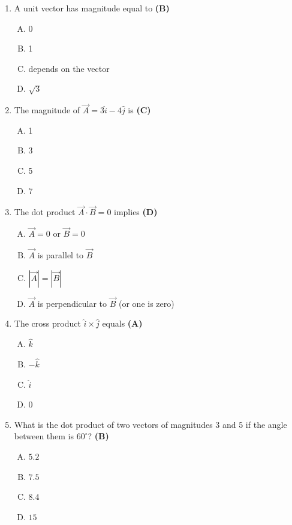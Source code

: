 \documentclass[10pt,a4paper]{article}
\begin{document}
\begin{enumerate}[1.]

\item A unit vector has magnitude equal to \hfill \textbf{(B)}
\begin{enumerate}[(A)]
    \item 0
    \item 1
    \item depends on the vector
    \item $\sqrt{3}$
\end{enumerate}

\item The magnitude of $\vec{A} = 3\hat{i} - 4\hat{j}$ is \hfill \textbf{(C)}
\begin{enumerate}[(A)]
    \item 1
    \item 3
    \item 5
    \item 7
\end{enumerate}

\item The dot product $\vec{A} \cdot \vec{B} = 0$ implies \hfill \textbf{(D)}
\begin{enumerate}[(A)]
    \item $\vec{A} = 0$ or $\vec{B} = 0$
    \item $\vec{A}$ is parallel to $\vec{B}$
    \item $|\vec{A}| = |\vec{B}|$
    \item $\vec{A}$ is perpendicular to $\vec{B}$ (or one is zero)
\end{enumerate}

\item The cross product $\hat{i} \times \hat{j}$ equals \hfill \textbf{(A)}
\begin{enumerate}[(A)]
    \item $\hat{k}$
    \item $-\hat{k}$
    \item $\hat{i}$
    \item $0$
\end{enumerate}

\item What is the dot product of two vectors of magnitudes 3 and 5 if the angle between them is $60^\circ$? \hfill \textbf{(B)}
\begin{enumerate}[(A)]
    \item $5.2$
    \item $7.5$
    \item $8.4$
    \item $15$
\end{enumerate}


\end{enumerate}
\end{document}
